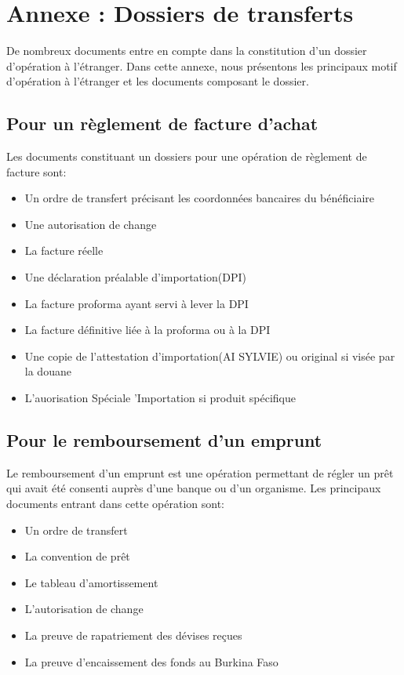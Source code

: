 \chapter{Annexe : Dossiers de transferts}

De nombreux documents entre en compte dans la constitution d'un dossier
d'opération à l'étranger. Dans cette annexe, nous présentons les principaux
motif d'opération à l'étranger et les documents composant le dossier. 

\section{Pour un règlement de facture d'achat}
Les documents constituant un dossiers pour une opération de règlement de facture
sont:
\begin{itemize}
  \item Un ordre de transfert précisant les coordonnées bancaires du
    bénéficiaire
  \item Une autorisation de change
  \item La facture réelle
  \item Une déclaration préalable d'importation(DPI)
  \item La facture proforma ayant servi à lever la DPI
  \item La facture définitive liée à la proforma ou à la DPI
  \item Une copie de l'attestation d'importation(AI SYLVIE) ou original si visée
    par la douane
  \item L'auorisation Spéciale 'Importation si produit spécifique
 \end{itemize}
\section{Pour le remboursement d'un emprunt}
Le remboursement d'un emprunt est une opération permettant de régler un prêt qui
avait été consenti auprès d'une banque ou d'un organisme. Les principaux
documents entrant dans cette opération sont:
\begin{itemize}
  \item Un ordre de transfert
  \item La convention de prêt
  \item Le tableau d'amortissement
  \item L'autorisation de change
  \item La preuve de rapatriement des dévises reçues
  \item La preuve d'encaissement des fonds au Burkina Faso
\end{itemize}

